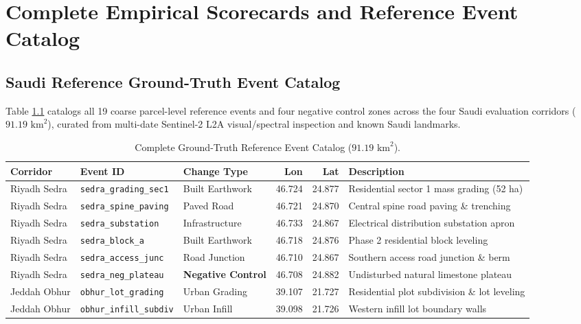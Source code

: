 \chapter{Complete Empirical Scorecards and Reference Event Catalog}
\label{app:scorecards}

\section{Saudi Reference Ground-Truth Event Catalog}
\label{sec:ref_event_catalog}
Table \ref{tab:catalog_reference_events} catalogs all 19 coarse parcel-level reference events and four negative control zones across the four Saudi evaluation corridors ($91.19\text{ km}^2$), curated from multi-date Sentinel-2 L2A visual/spectral inspection and known Saudi landmarks.

\begin{longtable}{@{}lllrrp{4.2cm}@{}}
\caption{Complete Ground-Truth Reference Event Catalog ($91.19\text{ km}^2$).}
\label{tab:catalog_reference_events} \\
\toprule
\textbf{Corridor} & \textbf{Event ID} & \textbf{Change Type} & \textbf{Lon} & \textbf{Lat} & \textbf{Description} \\
\midrule
\endhead
\bottomrule
\endfoot
Riyadh Sedra & \texttt{sedra\_grading\_sec1} & Built Earthwork & 46.724 & 24.877 & Residential sector 1 mass grading (52 ha) \\
Riyadh Sedra & \texttt{sedra\_spine\_paving} & Paved Road & 46.721 & 24.870 & Central spine road paving \& trenching \\
Riyadh Sedra & \texttt{sedra\_substation} & Infrastructure & 46.733 & 24.867 & Electrical distribution substation apron \\
Riyadh Sedra & \texttt{sedra\_block\_a} & Built Earthwork & 46.718 & 24.876 & Phase 2 residential block leveling \\
Riyadh Sedra & \texttt{sedra\_access\_junc} & Road Junction & 46.710 & 24.867 & Southern access road junction \& berm \\
Riyadh Sedra & \texttt{sedra\_neg\_plateau} & \textbf{Negative Control} & 46.708 & 24.882 & Undisturbed natural limestone plateau \\
\midrule
Jeddah Obhur & \texttt{obhur\_lot\_grading} & Urban Grading & 39.107 & 21.727 & Residential plot subdivision \& lot leveling \\
Jeddah Obhur & \texttt{obhur\_infill\_subdiv} & Urban Infill & 39.098 & 21.726 & Western infill lot boundary walls \\

\end{longtable}
